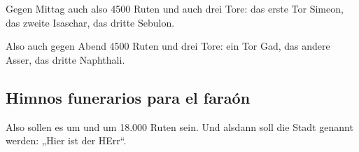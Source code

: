  Gegen Mittag auch also 4500 Ruten und auch drei Tore:
das erste Tor Simeon, das zweite Isaschar, das dritte Sebulon.

 Also auch gegen Abend 4500 Ruten und drei Tore: ein Tor
Gad, das andere Asser, das dritte Naphthali.

\hypertarget{himnos-funerarios-para-el-farauxf3n}{%
\subsection{Himnos funerarios para el
faraón}\label{himnos-funerarios-para-el-farauxf3n}}

 Also sollen es um und um 18.000 Ruten sein. Und alsdann
soll die Stadt genannt werden: „Hier ist der HErr``.
